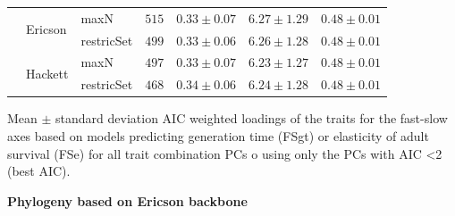 \begin{table}[ht!]
\begin{tabular}{@{}lllllll@{}}
\addlinespace
\multirow{4}{*}{FSgt best AIC} & \multirow{2}{*}{Ericson} & maxN & $515$ &
$0.33\pm0.07$ & $6.27\pm1.29$ & $0.48\pm0.01$\\
 &  & restricSet & $499$ & $0.33\pm0.06$ & $6.26\pm1.28$ & $0.48\pm0.01$\\
 & \multirow{2}{*}{Hackett} & maxN & $497$ & $0.33\pm0.07$ & $6.23\pm1.27$ & $0.48\pm0.01$\\
 &  & restricSet & $468$ & $0.34\pm0.06$ & $6.24\pm1.28$ & $0.48\pm0.01$\\
\bottomrule
\end{tabular}
\end{table}


\clearpage%
\begin{landscape}%
\begin{table}
\center
\caption[LHT loadings of the FS axes]{
Mean $\pm$ standard deviation AIC weighted loadings of the traits for the
fast-slow axes based on models predicting generation time (FSgt) or elasticity
of adult survival (FSe) for all trait combination PCs o using only the PCs with
AIC \textless{2} (best AIC).
}
\label{tab:tabApp2.2}
\begin{footnotesize}

\textbf{Phylogeny based on Ericson backbone}


\end{footnotesize}
\end{table}
\end{landscape}
